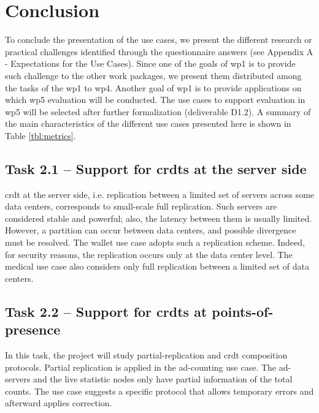 \documentclass[11pt,a4paper]{report}
\begin{document}
\chapter{Conclusion}
To conclude the presentation of the use cases, we present the different research or practical challenges identified through the questionnaire answers (see Appendix A - Expectations for the Use Cases). Since one of the goals of \gls{wp1} is to provide such challenge to the other work packages, we present them distributed among the tasks of the \gls{wp1} to \gls{wp4}. Another goal of \gls{wp1} is to provide applications on which \gls{wp5} evaluation will be conducted. The use cases to support evaluation in \gls{wp5} will be selected after further formalization (deliverable D1.2). A summary of the main characteristics of the different use cases presented here is shown in Table \ref{tbl:metrics}.


\section{Task 2.1 -- Support for \glspl{crdt} at the server side}
\gls{crdt} at the server side, i.e. replication between a limited set of servers across some data centers, corresponds to small-scale full replication. Such servers are considered stable and powerful; also, the latency between them is usually limited. However, a partition can occur between data centers, and possible divergence must be resolved.   
The wallet use case adopts such a replication scheme. Indeed, for security reasons, the replication occurs only at the data center level.
The medical use case also considers only full replication between a limited set of data centers.

\section{Task 2.2 --   Support for \glspl{crdt} at points-of-presence}
In this task, the project will study partial-replication and \gls{crdt} composition protocols. Partial replication is applied in the ad-counting use case. The ad-servers and the live statistic nodes only have partial information of the total counts. The use case suggests a specific protocol that allows temporary errors and afterward applies correction.
\end{document}
